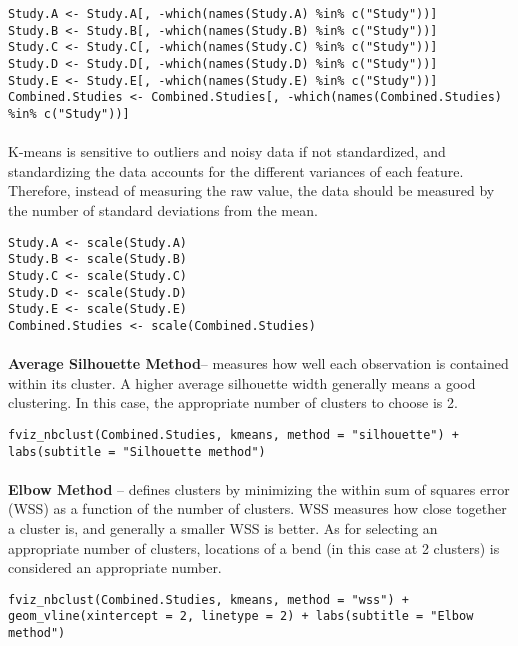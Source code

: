 \documentclass{article}
\begin{document}
	\begin{lstlisting}
Study.A <- Study.A[, -which(names(Study.A) %in% c("Study"))]
Study.B <- Study.B[, -which(names(Study.B) %in% c("Study"))]
Study.C <- Study.C[, -which(names(Study.C) %in% c("Study"))]
Study.D <- Study.D[, -which(names(Study.D) %in% c("Study"))]
Study.E <- Study.E[, -which(names(Study.E) %in% c("Study"))]
Combined.Studies <- Combined.Studies[, -which(names(Combined.Studies) %in% c("Study"))]
	\end{lstlisting}
	
	\paragraph{}K-means is sensitive to outliers and noisy data if not standardized, and standardizing the data accounts for the different variances of each feature. Therefore, instead of measuring the raw value, the data should be measured by the number of standard deviations from the mean.
	\begin{lstlisting}
Study.A <- scale(Study.A)
Study.B <- scale(Study.B)
Study.C <- scale(Study.C)
Study.D <- scale(Study.D)
Study.E <- scale(Study.E)
Combined.Studies <- scale(Combined.Studies)
	\end{lstlisting}
\paragraph{}	\textbf{Average Silhouette Method}– measures how well each observation is contained within its cluster. A higher average silhouette width generally means a good clustering. In this case, the appropriate number of clusters to choose is 2.
\begin{lstlisting}
fviz_nbclust(Combined.Studies, kmeans, method = "silhouette") + labs(subtitle = "Silhouette method")
\end{lstlisting}	
	
\paragraph{}	\textbf{Elbow Method} – defines clusters by minimizing the within sum of squares error (WSS) as a function of the number of clusters. WSS measures how close together a cluster is, and generally a smaller WSS is better. As for selecting an appropriate number of clusters, locations of a bend (in this case at 2 clusters) is considered an appropriate number.
\begin{lstlisting}
fviz_nbclust(Combined.Studies, kmeans, method = "wss") + geom_vline(xintercept = 2, linetype = 2) + labs(subtitle = "Elbow method")
\end{lstlisting}	
\end{document}
